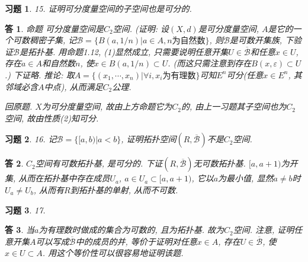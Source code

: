 \documentclass{ctexart}%
\newtheorem*{exercise}{习题}
\newtheorem*{solution}{答}
\theoremstyle{definition}
\theoremstyle{remark}
\begin{document}
\begin{exercise}15. 证明可分度量空间的子空间也是可分的.
\end{exercise}
\begin{solution}
命题 可分度量空间是$C_2$空间. (证明: 设$(X,d)$是可分度量空间, $A$是它的一个可数稠密子集, 记$\mathscr{B}=\{B(a,1/n)|a\in A, n\text{为自然数}\}$, 则$\mathscr{B}$是可数开集族, 下验证$\mathscr{B}$是拓扑基. 用命题1.12, (1)显然成立, 只需要说明任意开集$U\in \overline{\mathscr{B}}$和任意$x\in U$, 存在$a\in A$和自然数$n$, 使$x\in B(a,1/n) \subset U$. (而这只需注意到存在$B(x,\varepsilon)\subset U$.) 下证略. 推论: 取$A=\{(x_1,\cdots,x_n)|\forall i, x_i\text{为有理数}\}$可知$E^n$可分(任意$x\in E^n$, 其邻域必含$A$中点), 从而满足$C_2$公理.

回原题. $X$为可分度量空间, 故由上方命题它为$C_2$的, 由上一习题其子空间也为$C_2$空间, 故由性质(2)知可分. 
\end{solution}

\begin{exercise}16. 记$\mathscr{B}=\{[a,b)|a<b\}$, 证明拓扑空间$(R,\overline{\mathscr{B}})$不是$C_2$空间.
\end{exercise}
\begin{solution}$C_2$空间有可数拓扑基, 是可分的. 下证$(R,\overline{\mathscr{B}})$无可数拓扑基. $[a,a+1)$为开集, 从而在拓扑基中存在成员$U_a$, $a\in U_a\subset[a,a+1)$, 它以$a$为最小值, 显然$a\neq b$时$U_a\neq U_b$, 从而有$R$到拓扑基的单射, 从而不可数. 
\end{solution}

\begin{exercise}17. 
\end{exercise}
\begin{solution}当$a$为有理数时做成的集合为可数的, 且为拓扑基. 故为$C_2$空间. 注意, 证明任意开集$A$可以写成$\overline{\mathscr{B}}$中的成员的并, 等价于证明对任意$x\in A$, 存在$U\in \overline{\mathscr{B}}$, 使$x\in U\subset A$. 用这个等价性可以很容易地证明该题. 
\end{solution}
\end{document}
